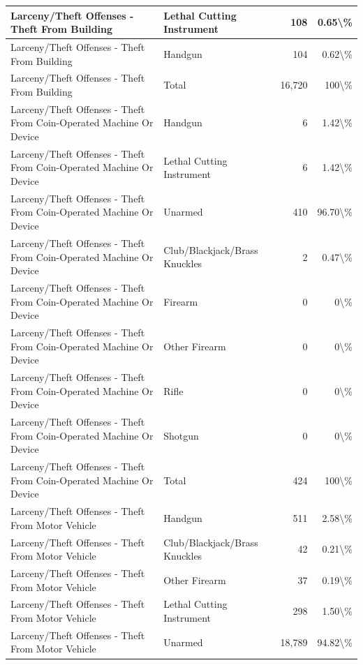 \documentclass[
]{krantz}
\begin{document}
\begin{longtable}[t]{l|l|r|r}
\hline
Larceny/Theft Offenses - Theft From Building & Lethal Cutting Instrument & 108 & 0.65\textbackslash{}\%\\
\hline
Larceny/Theft Offenses - Theft From Building & Handgun & 104 & 0.62\textbackslash{}\%\\
\hline
Larceny/Theft Offenses - Theft From Building & Total & 16,720 & 100\textbackslash{}\%\\
\hline
Larceny/Theft Offenses - Theft From Coin-Operated Machine Or Device & Handgun & 6 & 1.42\textbackslash{}\%\\
\hline
Larceny/Theft Offenses - Theft From Coin-Operated Machine Or Device & Lethal Cutting Instrument & 6 & 1.42\textbackslash{}\%\\
\hline
Larceny/Theft Offenses - Theft From Coin-Operated Machine Or Device & Unarmed & 410 & 96.70\textbackslash{}\%\\
\hline
Larceny/Theft Offenses - Theft From Coin-Operated Machine Or Device & Club/Blackjack/Brass Knuckles & 2 & 0.47\textbackslash{}\%\\
\hline
Larceny/Theft Offenses - Theft From Coin-Operated Machine Or Device & Firearm & 0 & 0\textbackslash{}\%\\
\hline
Larceny/Theft Offenses - Theft From Coin-Operated Machine Or Device & Other Firearm & 0 & 0\textbackslash{}\%\\
\hline
Larceny/Theft Offenses - Theft From Coin-Operated Machine Or Device & Rifle & 0 & 0\textbackslash{}\%\\
\hline
Larceny/Theft Offenses - Theft From Coin-Operated Machine Or Device & Shotgun & 0 & 0\textbackslash{}\%\\
\hline
Larceny/Theft Offenses - Theft From Coin-Operated Machine Or Device & Total & 424 & 100\textbackslash{}\%\\
\hline
Larceny/Theft Offenses - Theft From Motor Vehicle & Handgun & 511 & 2.58\textbackslash{}\%\\
\hline
Larceny/Theft Offenses - Theft From Motor Vehicle & Club/Blackjack/Brass Knuckles & 42 & 0.21\textbackslash{}\%\\
\hline
Larceny/Theft Offenses - Theft From Motor Vehicle & Other Firearm & 37 & 0.19\textbackslash{}\%\\
\hline
Larceny/Theft Offenses - Theft From Motor Vehicle & Lethal Cutting Instrument & 298 & 1.50\textbackslash{}\%\\
\hline
Larceny/Theft Offenses - Theft From Motor Vehicle & Unarmed & 18,789 & 94.82\textbackslash{}\%\\

\end{longtable}
\end{document}
